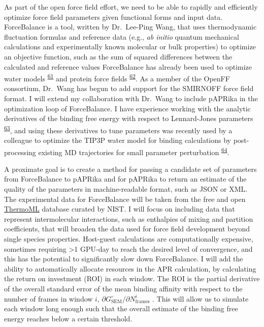 \documentclass[11pt,notitlepage]{article}
\providecommand{\DIFaddbegin}{} %
\providecommand{\DIFaddend}{} %
\providecommand{\DIFdelbegin}{} %
\providecommand{\DIFdelend}{} %
\newcommand{\DIFscaledelfig}{0.5}
\newlength{\DIFdelgraphicswidth} %
\newlength{\DIFdelgraphicsheight} %
\newcommand{\DIFaddincludegraphics}[2][]{{\color{blue}\fbox{\DIFOincludegraphics[#1]{#2}}}} %
\newcommand{\DIFdelincludegraphics}[2][]{%
\sbox{\DIFdelgraphicsbox}{\DIFOincludegraphics[#1]{#2}}%
\settoboxwidth{\DIFdelgraphicswidth}{\DIFdelgraphicsbox} %
\settoboxtotalheight{\DIFdelgraphicsheight}{\DIFdelgraphicsbox} %
\scalebox{\DIFscaledelfig}{%
\parbox[b]{\DIFdelgraphicswidth}{\usebox{\DIFdelgraphicsbox}\\[-\baselineskip] \rule{\DIFdelgraphicswidth}{0em}}\llap{\resizebox{\DIFdelgraphicswidth}{\DIFdelgraphicsheight}{%
\setlength{\unitlength}{\DIFdelgraphicswidth}%
\begin{picture}(1,1)%
\thicklines\linethickness{2pt} %
{\color[rgb]{1,0,0}\put(0,0){\framebox(1,1){}}}%
{\color[rgb]{1,0,0}\put(0,0){\line( 1,1){1}}}%
{\color[rgb]{1,0,0}\put(0,1){\line(1,-1){1}}}%
\end{picture}%
}\hspace*{3pt}}} %
} %
\DeclareRobustCommand{\DIFaddbegin}{\DIFOaddbegin \let\includegraphics\DIFaddincludegraphics} %
\DeclareRobustCommand{\DIFaddend}{\DIFOaddend \let\includegraphics\DIFOincludegraphics} %
\DeclareRobustCommand{\DIFdelbegin}{\DIFOdelbegin \let\includegraphics\DIFdelincludegraphics} %
\DeclareRobustCommand{\DIFdelend}{\DIFOaddend \let\includegraphics\DIFOincludegraphics} %
\begin{document}
As part of the open force field effort, we need to be able to rapidly
and efficiently optimize force field parameters given functional forms
and input data. ForceBalance is a tool, written by Dr.~Lee-Ping Wang,
that uses thermodynamic fluctuation formulas and reference data (e.g.,
\emph{ab initio} quantum mechanical calculations and experimentally
known molecular or bulk properties) to optimize an objective function,
such as the sum of squared differences between the calculated and
reference values ForceBalance has already been used to optimize water
models\textsuperscript{\protect\DIFdelbegin %
\DIFdelend \DIFaddbegin \hyperlink{ref-50lAQZra}{61}\DIFaddend } and protein
force fields\textsuperscript{\protect\DIFdelbegin %
\DIFdelend \DIFaddbegin \hyperlink{ref-1E3wArY0j}{62}\DIFaddend }. As
a member of the OpenFF consortium, Dr.~Wang has begun to add support for
the SMIRNOFF force field format. I will extend my collaboration with
Dr.~Wang to include pAPRika in the optimization loop of ForceBalance. I
have experience working with the analytic derivatives of the binding
free energy with respect to Lennard-Jones
parameters\textsuperscript{\protect\DIFdelbegin %
\DIFdelend \DIFaddbegin \hyperlink{ref-xRauI5mb}{63}\DIFaddend }, and
using these derivatives to tune parameters was recently used by a
colleague to optimize the TIP3P water model for binding calculations by
post-processing existing MD trajectories for small parameter
perturbation\textsuperscript{\protect\DIFdelbegin %
\DIFdelend \DIFaddbegin \hyperlink{ref-NeqIQDLp}{64}\DIFaddend }.

A proximate goal is to create a method for passing a candidate set of
parameters from ForceBalance to pAPRika and for pAPRika to return an
estimate of the quality of the parameters in machine-readable format,
such as JSON or XML. The experimental data for ForceBalance will be
taken from the free and open
\href{https://www.nist.gov/mml/acmd/trc/thermoml}{ThermoML} database
curated by NIST. I will focus on including data that represent
intermolecular interactions, such as enthalpies of mixing and partition
coefficients, that will broaden the data used for force field
development beyond single species properties. Host-guest calculations
are computationally expensive, sometimes requiring \textgreater{}1
GPU-day to reach the desired level of convergence, and this has the
potential to significantly slow down ForceBalance. I will add the
ability to automatically allocate resources in the APR calculation, by
calculating the return on investment (ROI) in each window. The ROI is
the partial derivative of the overall standard error of the mean binding
affinity with respect to the number of frames in window \(i\),
\(\partial G^\circ_\text{SEM} / \partial N^i_\text{frames}\) . This will
allow us to simulate each window long enough such that the overall
estimate of the binding free energy reaches below a certain threshold.
\end{document}
